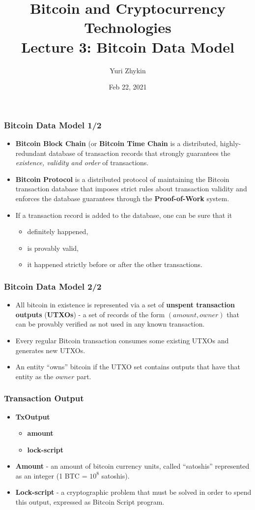 \documentclass{beamer}
\title{
  Bitcoin and Cryptocurrency Technologies \\
  Lecture 3: Bitcoin Data Model
}
\author{Yuri Zhykin}
\date{Feb 22, 2021}
\begin{document}
\frame{\titlepage}

\begin{frame}
  \frametitle{Bitcoin Data Model 1/2}
  \begin{itemize}
  \item \textbf{Bitcoin Block Chain} (or \textbf{Bitcoin Time Chain} is a
    distributed, highly-redundant database of transaction records that strongly
    guarantees the \textit{existence, validity and order} of transactions.
  \item \textbf{Bitcoin Protocol} is a distributed protocol of maintaining the
    Bitcoin transaction database that imposes strict rules about transaction
    validity and enforces the database guarantees through the
    \textbf{Proof-of-Work} system.
  \item If a transaction record is added to the database, one can be sure that
    it 
    \begin{itemize}
    \item definitely happened,
    \item is provably valid,
    \item it happened strictly before or after the other transactions.
    \end{itemize}
  \end{itemize}
\end{frame}

\begin{frame}
  \frametitle{Bitcoin Data Model 2/2}
  \begin{itemize}
  \item All bitcoin in existence is represented via a set of \textbf{unspent
      transaction outputs} (\textbf{UTXOs}) - a set of records of the form
    $(amount, owner)$ that can be provably verified as not used in any
    known transaction.
  \item Every regular Bitcoin transaction consumes some existing UTXOs and
    generates new UTXOs.
  \item An entity ``owns'' bitcoin if the UTXO set contains outputs that have
    that entity as the $owner$ part.
  \end{itemize}
\end{frame}

\begin{frame}
  \frametitle{Transaction Output}
  \begin{itemize}
  \item \textbf{TxOutput}
    \begin{itemize}
    \item \textbf{amount}
    \item \textbf{lock-script}
    \end{itemize}
  \item \textbf{Amount} - an amount of bitcoin currency units, called
    ``satoshis'' represented as an integer (1 BTC = $10^8$ satoshis).
  \item \textbf{Lock-script} - a cryptographic problem that must be solved in
    order to spend this output, expressed as Bitcoin Script program.
  \end{itemize}
\end{frame}
\end{document}
